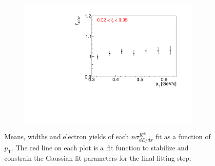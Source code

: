 \begin{figure}[h!]
\begin{subfigure}{.32\textwidth}
		\includegraphics[width=\linewidth, page=12]{chapters/chrgSTAR/img/dEdx/fit2019_fitResult_1_0_step_0.pdf}
	\end{subfigure}
	\caption{Means, widths and electron yields of each $n\sigma^{K^\pm}_{dE/dx}$ fit as a function of $p_\textrm{T}$.  The red line on each plot is a~fit function to stabilize and constrain the Gaussian fit parameters for the final fitting step.}
	\label{fig:dEdx_fit_parametersK}
\end{figure}

